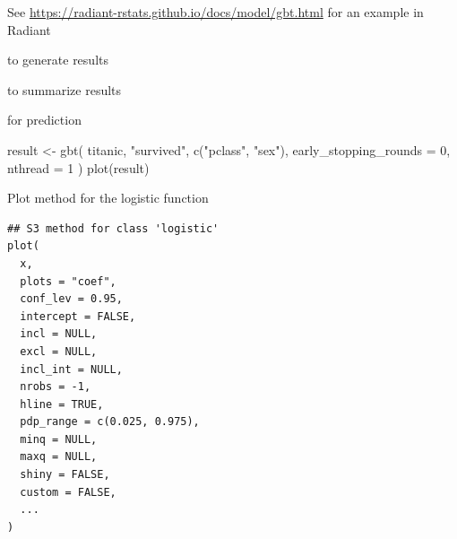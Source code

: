 \documentclass[a4paper]{book}
\begin{document}
%
\begin{Details}
See \url{https://radiant-rstats.github.io/docs/model/gbt.html} for an example in Radiant
\end{Details}
%
\begin{SeeAlso}
 to generate results

 to summarize results

 for prediction
\end{SeeAlso}
%
\begin{Examples}
\begin{ExampleCode}
result <- gbt(
  titanic, "survived", c("pclass", "sex"),
  early_stopping_rounds = 0, nthread = 1
)
plot(result)

\end{ExampleCode}
\end{Examples}
%
\begin{Description}
Plot method for the logistic function
\end{Description}
%
\begin{Usage}
\begin{verbatim}
## S3 method for class 'logistic'
plot(
  x,
  plots = "coef",
  conf_lev = 0.95,
  intercept = FALSE,
  incl = NULL,
  excl = NULL,
  incl_int = NULL,
  nrobs = -1,
  hline = TRUE,
  pdp_range = c(0.025, 0.975),
  minq = NULL,
  maxq = NULL,
  shiny = FALSE,
  custom = FALSE,
  ...
)
\end{verbatim}
\end{Usage}
%
\end{document}
